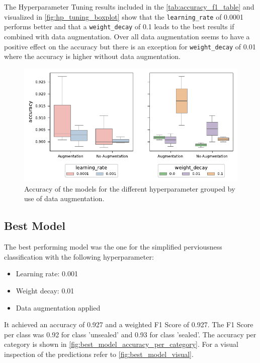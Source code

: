 The Hyperparameter Tuning results included in the \autoref{tab:accuracy_f1_table} and
visualized in \autoref{fig:hp_tuning_boxplot} show that the \texttt{learning\_rate} of 0.0001
performs better and that a \texttt{weight\_decay} of 0.1 leads to the best results if
combined with data augmentation. Over all data augmentation seems to have a positive
effect on the accuracy but there is an exception for \texttt{weight\_decay} of 0.01
where the accuracy is higher without data augmentation.

\begin{figure}[H]
    \centering
    \captionsetup{width=0.8\linewidth}
    \includegraphics{figures/hp_tuning_boxplot.pdf}
    \caption{Accuracy of the models for the different hyperparameter grouped by use of data augmentation.}
    \label{fig:hp_tuning_boxplot}
\end{figure}

\subsection{Best Model}%

The best performing model was the one for the simplified perviousness classification
with the following hyperparameter:
\begin{itemize}
    \item Learning rate: 0.001
    \item Weight decay: 0.01
    \item Data augmentation applied
\end{itemize}
It achieved an accuracy of 0.927 and a weighted F1 Score of 0.927.
The F1 Score per class was 0.92 for class 'unsealed' and 0.93 for class 'sealed'.
The accuracy per category is shown in \autoref{fig:best_model_accuracy_per_category}.
For a visual inspection of the predictions refer to \autoref{fig:best_model_visual}.

